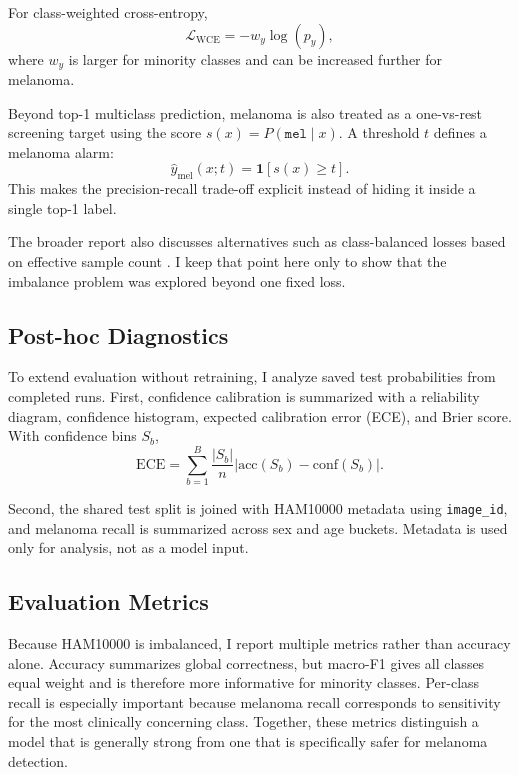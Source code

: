 \documentclass[conference]{IEEEtran}
\begin{document}
For class-weighted cross-entropy,
\begin{equation}
\mathcal{L}_{\mathrm{WCE}} = -w_y \log(p_y),
\end{equation}
where $w_y$ is larger for minority classes and can be increased further for melanoma.

Beyond top-1 multiclass prediction, melanoma is also treated as a one-vs-rest screening target using the score $s(x)=P(\texttt{mel}\mid x)$. A threshold $t$ defines a melanoma alarm:
\begin{equation}
\hat{y}_{\mathrm{mel}}(x;t) = \mathbf{1}[s(x)\ge t].
\end{equation}
This makes the precision-recall trade-off explicit instead of hiding it inside a single top-1 label.

The broader report also discusses alternatives such as class-balanced losses based on effective sample count \cite{cui2019classbalanced}. I keep that point here only to show that the imbalance problem was explored beyond one fixed loss.

\subsection{Post-hoc Diagnostics}
To extend evaluation without retraining, I analyze saved test probabilities from completed runs. First, confidence calibration is summarized with a reliability diagram, confidence histogram, expected calibration error (ECE), and Brier score. With confidence bins $S_b$,
\begin{equation}
\mathrm{ECE} = \sum_{b=1}^{B}\frac{|S_b|}{n}\left|\mathrm{acc}(S_b)-\mathrm{conf}(S_b)\right|.
\end{equation}

Second, the shared test split is joined with HAM10000 metadata using \texttt{image\_id}, and melanoma recall is summarized across sex and age buckets. Metadata is used only for analysis, not as a model input.

\subsection{Evaluation Metrics}
Because HAM10000 is imbalanced, I report multiple metrics rather than accuracy alone. Accuracy summarizes global correctness, but macro-F1 gives all classes equal weight and is therefore more informative for minority classes. Per-class recall is especially important because melanoma recall corresponds to sensitivity for the most clinically concerning class. Together, these metrics distinguish a model that is generally strong from one that is specifically safer for melanoma detection.
\end{document}
